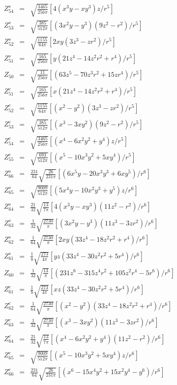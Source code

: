 \begin{eqnarray*}
Z^s_{54}&=&\sqrt{\frac{3465}{256\pi}}[4(x^3y-xy^3)z/r^5] \\
Z^s_{53}&=&\sqrt{\frac{385}{512\pi}}[(3x^2y-y^3)(9z^2-r^2)/r^5] \\
Z^s_{52}&=&\sqrt{\frac{1155}{64\pi}}[2xy(3z^3-zr^2)/r^5] \\
Z^s_{51}&=&\sqrt{\frac{165}{256\pi}}[y(21z^4-14z^2r^2+r^4)/r^5] \\
Z_{50}&=&\sqrt{\frac{11}{256\pi}}[(63z^5-70z^3r^2+15zr^4)/r^5] \\
Z^c_{51}&=&\sqrt{\frac{165}{256\pi}}[x(21z^4-14z^2r^2+r^4)/r^5] \\
Z^c_{52}&=&\sqrt{\frac{1155}{64\pi}}[(x^2-y^2)(3z^3-zr^2)/r^5] \\
Z^c_{53}&=&\sqrt{\frac{385}{512\pi}}[(x^3-3xy^2)(9z^2-r^2)/r^5] \\
Z^c_{54}&=&\sqrt{\frac{3465}{256\pi}}[(x^4-6x^2y^2+y^4)z/r^5] \\
Z^c_{55}&=&\sqrt{\frac{693}{512\pi}}[(x^5-10x^3y^2+5xy^4)/r^5] \\
\hline
Z^s_{66}&=&\frac{231}{64}\sqrt{\frac{26}{231\pi}}[(6x^5y-20x^3y^3+6xy^5)/r^6] \\
Z^s_{65}&=&\sqrt{\frac{9009}{512\pi}}[(5x^4y-10x^2y^3+y^5)z/r^6] \\
Z^s_{64}&=&\frac{21}{32}\sqrt{\frac{13}{7\pi}}[4(x^3y-xy^3)(11z^2-r^2)/r^6] \\
Z^s_{63}&=&\frac{1}{32}\sqrt{\frac{2730}{\pi}}[(3x^2y-y^3)(11z^3-3zr^2)/r^6] \\
Z^s_{62}&=&\frac{1}{64}\sqrt{\frac{2730}{\pi}}[2xy(33z^4-18z^2r^2+r^4)/r^6] \\
Z^s_{61}&=&\frac{1}{8}\sqrt{\frac{273}{4\pi}}[yz(33z^4-30z^2r^2+5r^4)/r^6] \\
Z_{60}&=&\frac{1}{32}\sqrt{\frac{13}{\pi}}[(231z^6-315z^4r^2+105z^2r^4-5r^6)/r^6] \\
Z^c_{61}&=&\frac{1}{8}\sqrt{\frac{273}{4\pi}}[xz(33z^4-30z^2r^2+5r^4)/r^6] \\
Z^c_{62}&=&\frac{1}{64}\sqrt{\frac{2730}{\pi}}[(x^2-y^2)(33z^4-18z^2r^2+r^4)/r^6] \\
Z^c_{63}&=&\frac{1}{32}\sqrt{\frac{2730}{\pi}}[(x^3-3xy^2)(11z^3-3zr^2)/r^6] \\
Z^c_{64}&=&\frac{21}{32}\sqrt{\frac{13}{7\pi}}[(x^4-6x^2y^2+y^4)(11z^2-r^2)/r^6] \\
Z^c_{65}&=&\sqrt{\frac{9009}{512\pi}}[(x^5-10x^3y^2+5xy^4)z/r^6] \\
Z^c_{66}&=&\frac{231}{64}\sqrt{\frac{26}{231\pi}}[(x^6-15x^4y^2+15x^2y^4-y^6)/r^6] 
\end{eqnarray*}





